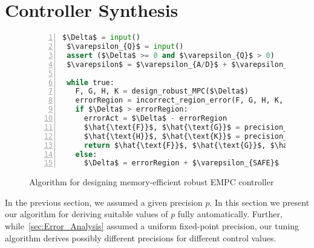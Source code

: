 \section{Controller Synthesis}\label{sec:Controller_Synthesis}

\begin{figure}
\begin{lstlisting}[language=Python,numbers=left,numbersep=3pt,frame=lines,keepspaces=true,mathescape=true,basicstyle=\small\ttfamily]
 $\Delta$ = input()
 $\varepsilon_{Q}$ = input()
 assert ($\Delta$ >= 0 and $\varepsilon_{Q}$ > 0)
 $\varepsilon$ = $\varepsilon_{A/D}$ + $\varepsilon_{Q}$

 while true:
   F, G, H, K = design_robust_MPC($\Delta$)
   errorRegion = incorrect_region_error(F, G, H, K, $\varepsilon$)
   if $\Delta$ > errorRegion:
     errorAct = $\Delta$ - errorRegion
     $\hat{\text{F}}$, $\hat{\text{G}}$ = precision_tuning(F, G, errorAct)
     $\hat{\text{H}}$, $\hat{\text{K}}$ = precision_tuning(H, K, $\varepsilon$)
     return $\hat{\text{F}}$, $\hat{\text{G}}$, $\hat{\text{H}}$, $\hat{\text{K}}$
   else:
     $\Delta$ = errorRegion + $\varepsilon_{SAFE}$
\end{lstlisting}
\caption{Algorithm for designing memory-efficient robust EMPC controller}
\label{lst:alg}
\end{figure}


In the previous section, we assumed a given precision $p$. In this section we
present our algorithm for deriving suitable values of $p$ fully automatically.
Further, while~\autoref{sec:Error_Analysis} assumed a uniform fixed-point precision,
our tuning algorithm derives possibly different precisions for different control
values.

